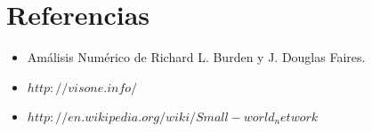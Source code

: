 \section{Referencias}

\begin{itemize}

\item Am\'alisis Num\'erico de Richard L. Burden y J. Douglas Faires.
\item $http://visone.info/$
\item $http://en.wikipedia.org/wiki/Small-world_network$

\end{itemize}
